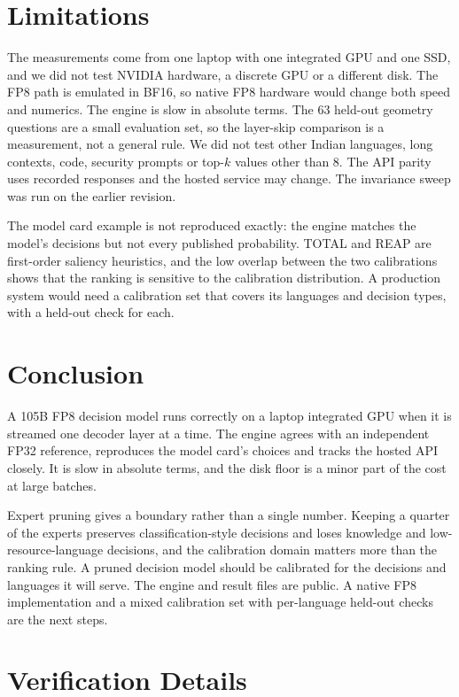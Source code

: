 \documentclass[11pt,a4paper]{article}
\begin{document}
\section{Limitations}

The measurements come from one laptop with one integrated GPU and one SSD, and we did not test NVIDIA hardware, a discrete GPU or a different disk. The FP8 path is emulated in BF16, so native FP8 hardware would change both speed and numerics. The engine is slow in absolute terms. The 63 held-out geometry questions are a small evaluation set, so the layer-skip comparison is a measurement, not a general rule. We did not test other Indian languages, long contexts, code, security prompts or top-$k$ values other than 8. The API parity uses recorded responses and the hosted service may change. The invariance sweep was run on the earlier revision.

The model card example is not reproduced exactly: the engine matches the model's decisions but not every published probability. TOTAL and REAP are first-order saliency heuristics, and the low overlap between the two calibrations shows that the ranking is sensitive to the calibration distribution. A production system would need a calibration set that covers its languages and decision types, with a held-out check for each.

\section{Conclusion}

A 105B FP8 decision model runs correctly on a laptop integrated GPU when it is streamed one decoder layer at a time. The engine agrees with an independent FP32 reference, reproduces the model card's choices and tracks the hosted API closely. It is slow in absolute terms, and the disk floor is a minor part of the cost at large batches.

Expert pruning gives a boundary rather than a single number. Keeping a quarter of the experts preserves classification-style decisions and loses knowledge and low-resource-language decisions, and the calibration domain matters more than the ranking rule. A pruned decision model should be calibrated for the decisions and languages it will serve. The engine and result files are public. A native FP8 implementation and a mixed calibration set with per-language held-out checks are the next steps.

\appendix
\section{Verification Details}
\label{app:verification}
\end{document}
